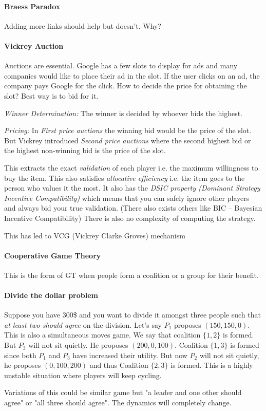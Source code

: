 \paragraph{Braess Paradox} Adding more links should help but doesn't. Why?

\paragraph{Vickrey Auction} Auctions are essential. Google has a few slots to display for ads and many companies would like to place their ad in the slot. If the user clicks on an ad, the company pays Google for the click. How to decide the price for obtaining the slot? Best way is to bid for it.  

\textit{Winner Determination:} The winner is decided by whoever bids the highest.

\textit{Pricing:} In \textit{First price auctions} the winning bid would be the price of the slot. But Vickrey introduced \textit{Second price auctions} where the second highest bid or the highest non-winning bid is the price of the slot.

This extracts the exact \textit{validation} of each player i.e. the maximum willingness to buy the item. This also satisfies \textit{allocative efficiency} i.e. the item goes to the person who values it the most. It also has the \textit{DSIC property (Dominant Strategy Incentive Compatibility)} which means that you can safely ignore other players and always bid your true validation. (There also exists others like BIC -- Bayesian Incentive Compatibility) There is also no complexity of computing the strategy.

This has led to VCG (Vickrey Clarke Groves) mechanism

\paragraph{Cooperative Game Theory} This is the form of GT when people form a coalition or a group for their benefit.

\paragraph{Divide the dollar problem} Suppose you have 300\$ and you want to divide it amongst three people such that \textit{at least two should agree} on the division. Let's say $P_1$ proposes $(150, 150, 0)$. This is also a simultaneous moves game. We say that coalition $\{1,2\}$ is formed. But $P_3$ will not sit quietly. He proposes $(200, 0, 100)$. Coalition $\{ 1,3\}$ is formed since both $P_1$ and $P_3$ have increased their utility. But now $P_2$ will not sit quietly, he proposes $(0, 100, 200)$ and thus Coalition $\{2, 3\}$ is formed. This is a highly unstable situation where players will keep cycling.

Variations of this could be similar game but "a leader and one other should agree" or "all three should agree". The dynamics will completely change. 
